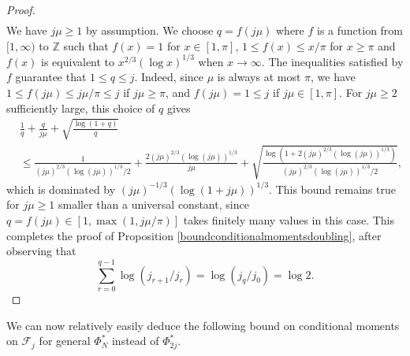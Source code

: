 \documentclass[]{article}
\begin{document}
\begin{proof}
\begin{align*}
\end{align*}
We have $j \mu \geq 1$ by assumption. 
We choose $q = f(j \mu)$ where $f$ is a function 
from $[1, \infty)$ to $\mathbb{Z}$ such that $f(x) = 1$ for 
$x \in [1, \pi]$, $1 \leq f(x) \leq x/\pi$ for $x \geq \pi$ and $f(x)$ is equivalent to $x^{2/3} (\log x)^{1/3}$ when $x \rightarrow \infty$. 
The inequalities satisfied by $f$ guarantee that 
$1 \leq q \leq j$. Indeed, since $\mu$ is always at most $\pi$, we have $1 \leq f(j \mu) \leq j \mu/ \pi \leq j$ if $j \mu \geq \pi$, and $ f(j \mu) = 1 \leq j $ if $j \mu \in [1, \pi]$. 
For $j \mu \geq 2$ sufficiently large, this choice of $q$ gives 
\begin{align*}
    &\frac{1}{q} + \frac{q}{j \mu} 
+  \sqrt{ \frac{\log (1+q)}{q} } 
\\ & \leq \frac{1}{(j \mu)^{2/3} (\log (j \mu))^{1/3}/2} + \frac{ 2 (j \mu)^{2/3} (\log (j \mu))^{1/3} }{j \mu} + \sqrt{ \frac{\log (1+2 (j \mu)^{2/3} (\log (j \mu))^{1/3} )}{(j \mu)^{2/3} (\log (j \mu))^{1/3}/2} },
 \end{align*}
which is dominated by $(j \mu)^{-1/3} (\log (1 + j \mu))^{1/3}$. 
This bound remains true for $j \mu \geq 1$ smaller than a universal constant, since $q = f(j \mu) \in [1, \max(1, j \mu/\pi)]$ takes finitely many values in this case.
This completes the proof of Proposition \ref{boundconditionalmomentsdoubling}, after observing that 
$$\sum_{r = 0}^{q-1} \log (j_{r+1}/j_r) 
= \log (j_q/j_0) = \log 2.$$

\end{proof}


We can now relatively easily deduce the following bound on conditional moments on $\mathcal{F}_j$ for general $\Phi_N^*$ instead of $\Phi_{2j}^*$.
\end{document}

